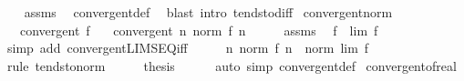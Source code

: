 \begin{isabellebody}
%
\isadelimproof
\ \ %
\endisadelimproof
%
\isatagproof
{}\isamarkupfalse%
\ assms\ \isamarkupfalse%
\ convergent{\isacharunderscore}{\kern0pt}def\ \isamarkupfalse%
\ {\isacharparenleft}{\kern0pt}blast\ intro{\isacharcolon}{\kern0pt}\ tendsto{\isacharunderscore}{\kern0pt}diff{\isacharparenright}{\kern0pt}%
\endisatagproof
{\isafoldproof}%
%
\isadelimproof
\isanewline
%
\endisadelimproof
\isanewline
{}\isamarkupfalse%
\ convergent{\isacharunderscore}{\kern0pt}norm{\isacharcolon}{\kern0pt}\isanewline
\ \ \ {\isachardoublequoteopen}convergent\ f{\isachardoublequoteclose}\isanewline
\ \ \ {\isachardoublequoteopen}convergent\ {\isacharparenleft}{\kern0pt}{\isasymlambda}n{\isachardot}{\kern0pt}\ norm\ {\isacharparenleft}{\kern0pt}f\ n{\isacharparenright}{\kern0pt}{\isacharparenright}{\kern0pt}{\isachardoublequoteclose}\isanewline
%
\isadelimproof
%
\endisadelimproof
%
\isatagproof
{}\isamarkupfalse%
\ {\isacharminus}{\kern0pt}\isanewline
\ \ \isamarkupfalse%
\ assms\ \isamarkupfalse%
\ {\isachardoublequoteopen}f\ {\isasymlonglonglongrightarrow}\ lim\ f{\isachardoublequoteclose}\isanewline
\ \ \ \ \isamarkupfalse%
\ {\isacharparenleft}{\kern0pt}simp\ add{\isacharcolon}{\kern0pt}\ convergent{\isacharunderscore}{\kern0pt}LIMSEQ{\isacharunderscore}{\kern0pt}iff{\isacharparenright}{\kern0pt}\isanewline
\ \ \isamarkupfalse%
\ \isamarkupfalse%
\ {\isachardoublequoteopen}{\isacharparenleft}{\kern0pt}{\isasymlambda}n{\isachardot}{\kern0pt}\ norm\ {\isacharparenleft}{\kern0pt}f\ n{\isacharparenright}{\kern0pt}{\isacharparenright}{\kern0pt}\ {\isasymlonglonglongrightarrow}\ norm\ {\isacharparenleft}{\kern0pt}lim\ f{\isacharparenright}{\kern0pt}{\isachardoublequoteclose}\isanewline
\ \ \ \ \isamarkupfalse%
\ {\isacharparenleft}{\kern0pt}rule\ tendsto{\isacharunderscore}{\kern0pt}norm{\isacharparenright}{\kern0pt}\isanewline
\ \ \isamarkupfalse%
\ \isamarkupfalse%
\ {\isacharquery}{\kern0pt}thesis\isanewline
\ \ \ \ \isamarkupfalse%
\ {\isacharparenleft}{\kern0pt}auto\ simp{\isacharcolon}{\kern0pt}\ convergent{\isacharunderscore}{\kern0pt}def{\isacharparenright}{\kern0pt}\isanewline
{}\isamarkupfalse%
%
\endisatagproof
{\isafoldproof}%
%
\isadelimproof
\isanewline
%
\endisadelimproof
\isanewline
{}\isamarkupfalse%
\ convergent{\isacharunderscore}{\kern0pt}of{\isacharunderscore}{\kern0pt}real{\isacharcolon}{\kern0pt}\isanewline

\end{isabellebody}
